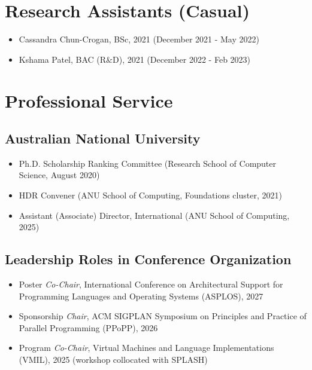 \documentclass[singlecolumn,singlespace,11pt,a4paper]{article}
\begin{document}
\section*{Research Assistants (Casual)}
\begin{itemize}
\item Cassandra Chun-Crogan, BSc, 2021 (December 2021 - May 2022)
\item Kshama Patel, BAC (R\&D), 2021 (December 2022 - Feb 2023)
\end{itemize}

\section*{Professional Service}

\subsection*{Australian National University}
\begin{itemize}
\item Ph.D. Scholarship Ranking Committee (Research School of Computer Science, August 2020)
\item HDR Convener (ANU School of Computing, Foundations cluster, 2021)
\item Assistant (Associate) Director, International (ANU School of Computing, 2025)
\end{itemize}


\subsection*{Leadership Roles in Conference Organization}
\begin{itemize}
\item Poster \textit{Co-Chair}, International Conference on Architectural Support for Programming Languages and Operating Systems (ASPLOS), 2027
\item Sponsorship \textit{Chair}, ACM SIGPLAN Symposium on Principles and Practice of Parallel Programming (PPoPP), 2026
\item Program \textit{Co-Chair}, Virtual Machines and Language Implementations (VMIL), 2025 (workshop collocated with SPLASH)
\end{itemize}
\end{document}
